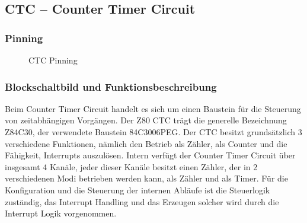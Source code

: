 \subsection{CTC -- Counter Timer Circuit}
\subsubsection{Pinning}
\begin{figure}[htb]
    \qquad
    \qquad
    \caption[Z80 CTC Pinning]{CTC Pinning \cite{z80:ctc}}
    \label{fig:z80-ctc-pinning}
\end{figure}

\subsubsection{Blockschaltbild und Funktionsbeschreibung}
Beim Counter Timer Circuit handelt es sich um einen Baustein für die Steuerung von zeitabhängigen Vorgängen. Der Z80 CTC trägt die generelle Bezeichnung Z84C30, der verwendete Baustein 84C3006PEG. Der CTC besitzt grundsätzlich 3 verschiedene Funktionen, nämlich den Betrieb als Zähler, als Counter und die Fähigkeit, Interrupts auszulösen. Intern verfügt der Counter Timer Circuit über insgesamt 4 Kanäle, jeder dieser Kanäle besitzt einen Zähler, der in 2 verschiedenen Modi betrieben werden kann, als Zähler und als Timer. Für die Konfiguration und die Steuerung der internen Abläufe ist die Steuerlogik zuständig, das Interrupt Handling und das Erzeugen solcher wird durch die Interrupt Logik vorgenommen.

